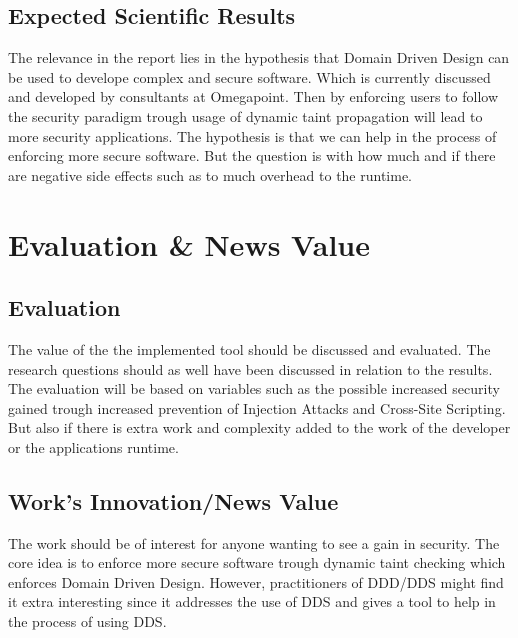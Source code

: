 \documentclass{../kththesis}
\begin{document}
\section{Expected Scientific Results}
The relevance in the report lies in the hypothesis that Domain Driven Design can be used to develope complex and secure software. Which is currently discussed and developed by consultants at Omegapoint. Then by enforcing users to follow the security paradigm trough usage of dynamic taint propagation will lead to more security applications. The hypothesis is that we can help in the process of enforcing more secure software. But the question is with how much and if there are negative side effects such as to much overhead to the runtime.



\chapter{Evaluation \& News Value}
\section{Evaluation}
The value of the the implemented tool should be discussed and evaluated. The research questions should as well have been discussed in relation to the results. The evaluation will be based on variables such as the possible increased security gained trough increased prevention of Injection Attacks and Cross-Site Scripting. But also if there is extra work and complexity added to the work of the developer or the applications runtime.


\section{Work's Innovation/News Value}
The work should be of interest for anyone wanting to see a gain in security. The core idea is to enforce more secure software trough dynamic taint checking which enforces Domain Driven Design. However, practitioners of DDD/DDS might find it extra interesting since it addresses the use of DDS and gives a tool to help in the process of using DDS.
\end{document}

